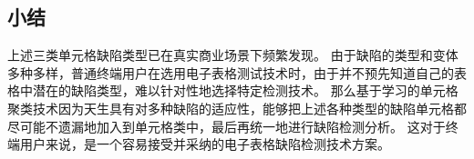 \subsection{小结}
上述三类单元格缺陷类型已在真实商业场景下频繁发现\cite{panko2006facing,powell2008critical}。
由于缺陷的类型和变体多种多样，普通终端用户在选用电子表格测试技术时，由于并不预先知道自己的表格中潜在的缺陷类型，难以针对性地选择特定检测技术。
那么基于学习的单元格聚类技术因为天生具有对多种缺陷的适应性，能够把上述各种类型的缺陷单元格都尽可能不遗漏地加入到单元格类中，最后再统一地进行缺陷检测分析。
这对于终端用户来说，是一个容易接受并采纳的电子表格缺陷检测技术方案。